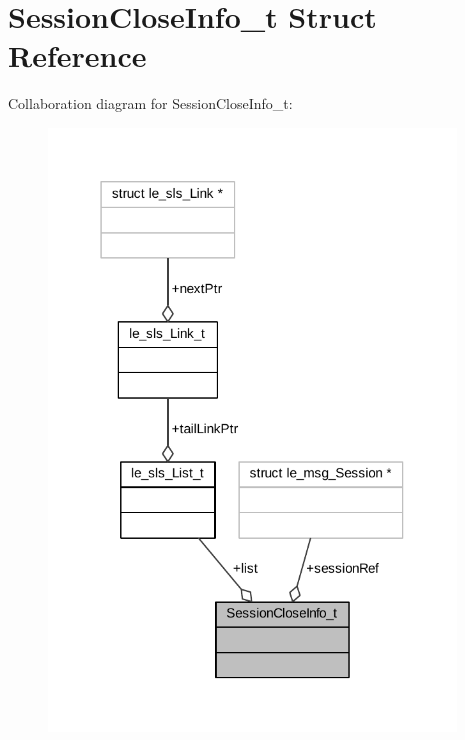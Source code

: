 \hypertarget{struct_session_close_info__t}{}\section{Session\+Close\+Info\+\_\+t Struct Reference}
\label{struct_session_close_info__t}


Collaboration diagram for Session\+Close\+Info\+\_\+t\+:
\nopagebreak
\begin{figure}[H]
\begin{center}
\leavevmode
\includegraphics[width=307pt]{struct_session_close_info__t__coll__graph}
\end{center}
\end{figure}
